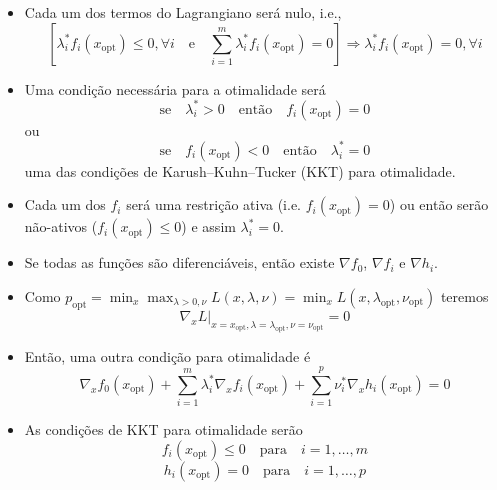 \begin{frame}[allowframebreaks]
\begin{itemize}
  \item Cada um dos termos do Lagrangiano será nulo, i.e.,
	\begin{equation}
	\left[ \lambda_i^\ast f_i(x_{\text{opt}}) \leq 0, \forall i \quad \text{e} \quad 
		\sum_{i=1}^{m} \lambda_i^\ast f_i(x_{\text{opt}}) = 0 \right] \Rightarrow
		 \lambda_i^\ast f_i(x_{\text{opt}}) = 0 , \forall i
	\end{equation}
  \item Uma condição necessária para a otimalidade será 
	\begin{equation}
	\text{se} \quad \lambda_i^\ast > 0 \quad \text{então} \quad f_i(x_{\text{opt}}) = 0
	\end{equation}
	ou
	\begin{equation}
	\text{se} \quad  f_i(x_{\text{opt}}) < 0 \quad \text{então} \quad \lambda_i^\ast = 0
        \end{equation}
	uma das condições de Karush–Kuhn–Tucker (KKT) para otimalidade.
  \item Cada um dos $f_i$ será uma restrição ativa (i.e. $f_i(x_{\text{opt}}) = 0$) ou então
	serão não-ativos ($f_i(x_{\text{opt}}) \leq 0$) e assim $\lambda_i^\ast = 0$.
  \item Se todas as funções são diferenciáveis, então existe $\nabla f_0$, $\nabla f_i$
	e $\nabla h_i$.
  \item Como $p_{\text{opt}} = \min_x \max_{\lambda > 0, \nu} L(x, \lambda, \nu) = \min_x L(x, \lambda_{\text{opt}}, \nu_{\text{opt}})$ teremos
	\begin{equation}
	\nabla_x L \vert_{x = x_{\text{opt}}, \lambda = \lambda_{\text{opt}} , \nu = \nu_{\text{opt}}} = 0
	\end{equation}
  \item Então, uma outra condição para otimalidade é
	\begin{equation}
	\nabla_x f_0 (x_{\text{opt}}) + \sum_{i=1}^{m} \lambda_i^\ast \nabla_x f_i (x_{\text{opt}}) +
	\sum_{i=1}^{p} \nu_i^\ast \nabla_x h_i (x_{\text{opt}}) = 0
	\end{equation}
  \item As condições de KKT para otimalidade serão
	\begin{equation}
	f_i(x_{\text{opt}}) \leq 0 \quad \text{para} \quad i = 1, \ldots , m
	\end{equation}
        \begin{equation}
        h_i(x_{\text{opt}}) = 0 \quad \text{para} \quad i = 1, \ldots , p
        \end{equation}
        \begin{equation}

\end{equation}
\end{itemize}
\end{frame}
